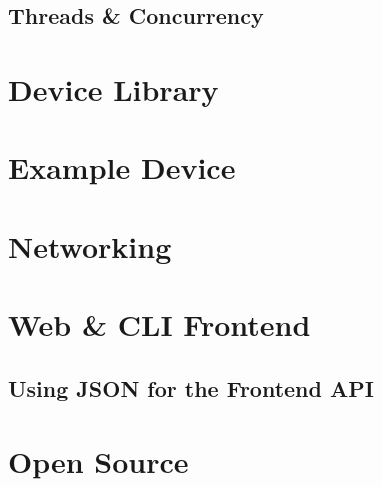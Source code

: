 \subsection{Threads \& Concurrency} \label{sec:chap3:server:threads}


\section{Device Library} \label{sec:chap3:devicelib}
\section{Example Device} \label{sec:chap3:deviceexample}
\section{Networking}

\section{Web \& CLI Frontend} \label{sec:chap3:frontend}
\subsection{Using JSON for the Frontend API} \label{sec:chap3:frontend:json}
\section{Open Source} \label{sec:chap3:opensource}
